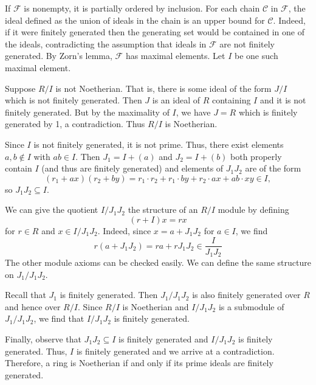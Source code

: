 \documentclass[../../master.tex]{subfiles}
\begin{document}
    \begin{solution}
        If $\mathscr{F}$ is nonempty, it is partially ordered by inclusion. For
        each chain $\mathscr{C}$ in $\mathscr{F}$, the ideal defined as the
        union of ideals in the chain is an upper bound for $\mathscr{C}$.
        Indeed, if it were finitely generated then the generating set would be
        contained in one of the ideals, contradicting the assumption that ideals
        in $\mathscr{F}$ are not finitely generated. By Zorn's lemma,
        $\mathscr{F}$ has maximal elements. Let $I$ be one such maximal element.

        Suppose $R / I$ is not Noetherian. That is, there is some ideal of the form
        $J / I$ which is not finitely generated. Then $J$ is an ideal of $R$
        containing $I$ and it is not finitely generated. But by the maximality
        of $I$, we have $J = R$ which is finitely generated by 1, a
        contradiction. Thus $R / I$ is Noetherian.

        Since $I$ is not finitely generated, it is not prime. Thus, there exist
        elements $a, b \notin I$ with $ab \in I$. Then $J_1 = I + (a)$ and $J_2
        = I + (b)$ both properly contain $I$ (and thus are finitely generated)
        and elements of $J_1 J_2$ are of the form
        \[
            (r_1 + ax) (r_2 + by) = r_1 \cdot r_2 + r_1 \cdot by + r_2 \cdot ax
            + ab \cdot xy \in I,
        \] 
        so $J_1 J_2 \subseteq I$.

        We can give the quotient $I / J_1 J_2$ the structure of an $R / I$
        module by defining
        \[
            (r + I) x = rx
        \] 
        for $r \in R$ and $x \in I / J_1 J_2$. Indeed, since $x = a + J_1 J_2$
        for $a \in I$, we find 
        \[
            r(a + J_1 J_2) = ra + r J_1 J_2 \in \frac{I}{J_1 J_2}
        \] 
        The other module axioms can be checked easily. We can define the same
        structure on $J_1 / J_1 J_2$. 

        Recall that $J_1$ is finitely generated. Then $J_1 / J_1 J_2$ is also
        finitely generated over $R$ and hence over $R / I$. Since $R / I$ is
        Noetherian and $I / J_1 J_2$ is a submodule of $J_1 / J_1 J_2$, we find
        that $I / J_1 J_2$ is finitely generated.

        Finally, observe that $J_1 J_2 \subseteq I$ is finitely generated and $I
        / J_1 J_2$ is finitely generated. Thus, $I$ is finitely generated and we
        arrive at a contradiction. Therefore, a ring is Noetherian if and only
        if its prime ideals are finitely generated.
    \end{solution}
\end{document}
